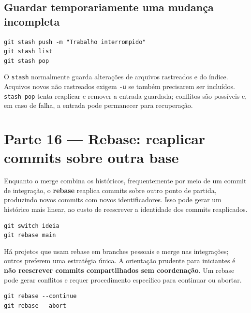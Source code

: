 \documentclass[11pt,a4paper]{article}
\begin{document}
\subsection*{Guardar temporariamente uma mudança incompleta}
\begin{lstlisting}
git stash push -m "Trabalho interrompido"
git stash list
git stash pop
\end{lstlisting}
O \texttt{stash} normalmente guarda alterações de arquivos rastreados e do índice. Arquivos novos não rastreados exigem \texttt{-u} se também precisarem ser incluídos. \texttt{stash pop} tenta reaplicar e remover a entrada guardada; conflitos são possíveis e, em caso de falha, a entrada pode permanecer para recuperação.

\section*{Parte 16 --- Rebase: reaplicar commits sobre outra base}
Enquanto o merge combina os históricos, frequentemente por meio de um commit de integração, o \textbf{rebase} reaplica commits sobre outro ponto de partida, produzindo novos commits com novos identificadores. Isso pode gerar um histórico mais linear, ao custo de reescrever a identidade dos commits reaplicados.
\begin{lstlisting}
git switch ideia
git rebase main
\end{lstlisting}
Há projetos que usam rebase em branches pessoais e merge nas integrações; outros preferem uma estratégia única. A orientação prudente para iniciantes é \textbf{não reescrever commits compartilhados sem coordenação}. Um rebase pode gerar conflitos e requer procedimento específico para continuar ou abortar.
\begin{lstlisting}
git rebase --continue
git rebase --abort
\end{lstlisting}
\end{document}

